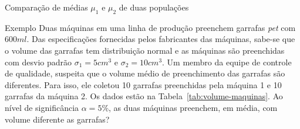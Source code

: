 \documentclass[9pt]{beamer}
\begin{document}
\begin{frame}{Comparação de médias $\mu_1$ e $\mu_2$ de duas populações}

\begin{block}{Exemplo}
	Duas máquinas em uma linha de produção preenchem garrafas \textit{pet} com $600ml$. Das especificações fornecidas pelos fabricantes das máquinas, sabe-se que o volume das garrafas tem distribuição normal e as máquinas são preenchidas com desvio padrão $\sigma_1=5cm^3$ e $\sigma_2=10cm^3$. Um membro da equipe de controle de qualidade, suspeita que o volume médio de preenchimento das garrafas são diferentes. Para isso, ele coletou 10 garrafas preenchidas pela máquina 1 e 10 garrafas da máquina 2. Os dados estão na Tabela~\ref{tab:volume-maquinas}. Ao nível de significância $\alpha=5\%$, as duas máquinas preenchem, em média, com volume diferente as garrafas?
	\begin{table}[ht]
		\centering
		\caption{Amostras para as máquinas 1 e 2.} 
		\label{tab:volume-maquinas}
	\end{table}
\end{block}

\end{frame}
\end{document}
